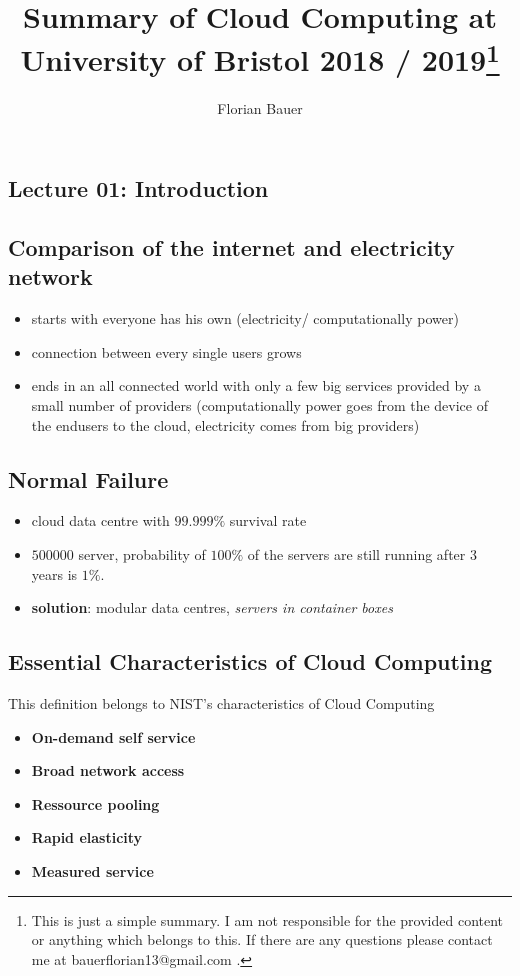 \documentclass[a4paper]{article}
\title{\vspace*{\fill}Summary of Cloud Computing at University of Bristol 2018 / 2019\footnote{This is just a simple summary.
I am not responsible for the provided content or anything which belongs to this. If there are any questions please contact me at
bauerflorian13@gmail.com .}}
\author{Florian Bauer\vspace*{\fill}}
\begin{document}
  \begin{titlepage}
    \clearpage
    \maketitle
    \thispagestyle{empty}
  \end{titlepage}

  \begingroup
    \hypersetup{linkcolor=black}
    \clearpage
    \tableofcontents
    \thispagestyle{empty}
  \endgroup
  \pagebreak

  \setcounter{section}{-1}
  \setcounter{page}{1}
  \begin{multicols}{3}

\section*{Lecture 01: Introduction}

\subsection*{Comparison of the internet and electricity network}
\begin{itemize}
    \item starts with everyone has his own (electricity/ computationally power)
    \item connection between every single users grows
    \item ends in an all connected world with only a few big services provided by a small number of providers
    (computationally power goes from the device of the endusers to the cloud, electricity comes from big providers) 
\end{itemize}

\subsection*{Normal Failure}
\begin{itemize}
    \item cloud data centre with $99.999\%$ survival rate
    \item $500 000$ server, probability of $100\%$ of the servers are still running after 3 years is $1\%$.
    \item \textbf{solution}: modular data centres, \textit{servers in container boxes}
\end{itemize}

\subsection*{Essential Characteristics of Cloud Computing}
This definition belongs to NIST's characteristics of Cloud Computing
\begin{itemize}
    \item \textbf{On-demand self service}
    \item \textbf{Broad network access}
    \item \textbf{Ressource pooling}
    \item \textbf{Rapid elasticity}
    \item \textbf{Measured service}
\end{itemize}


\end{multicols}
\end{document}
